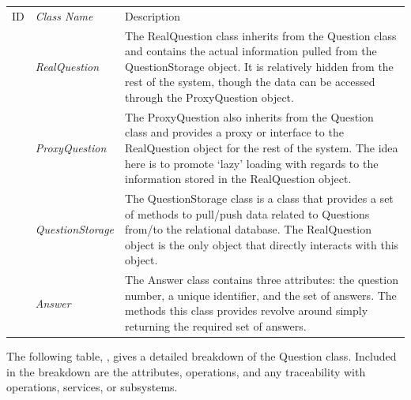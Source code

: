 \documentclass[12pt,letterpaper]{article}
\begin{document}
\begin{center}
\begin{tabu} to 
	    \tableheader{}ID & Class Name & Description \\
		 & RealQuestion & The RealQuestion class inherits from the Question class and contains the actual information pulled from the QuestionStorage object. It is relatively hidden from the rest of the system, though the data can be accessed through the ProxyQuestion object.\\
		 & ProxyQuestion & The ProxyQuestion also inherits from the Question class and provides a proxy or interface to the RealQuestion object for the rest of the system. The idea here is to promote `lazy' loading with regards to the information stored in the RealQuestion object.\\
	     & QuestionStorage & The QuestionStorage class is a class that provides a set of methods to pull/push data related to Questions from/to the relational database. The RealQuestion object is the only object that directly interacts with this object.\\
	 & Answer & The Answer class contains three attributes: the question number, a unique identifier, and the set of answers. The methods this class provides revolve around simply returning the required set of answers.\\
	\end{tabu}
\end{center}

The following table, , gives a detailed breakdown of the Question class. Included in the breakdown are the attributes, operations, and any traceability with operations, services, or subsystems.
\end{document}

